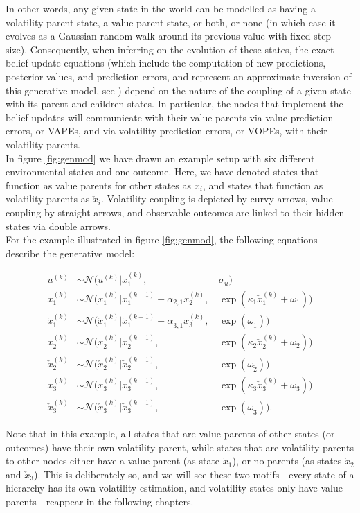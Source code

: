 In other words, any given state in the world can be modelled as having a volatility parent state, a value parent state, or both, or none (in which case it evolves as a Gaussian random walk around its previous value with fixed step size). Consequently, when inferring on the evolution of these states, the exact belief update equations (which include the computation of new predictions, posterior values, and prediction errors, and represent an approximate inversion of this generative model, see \cite{Mathys2011}) depend on the nature of the coupling of a given state with its parent and children states. In particular, the nodes that implement the belief updates will communicate with their value parents via value prediction errors, or \textsf{VAPE}s, and via volatility prediction errors, or \textsf{VOPE}s, with their volatility parents.\\

In figure \ref{fig:genmod} we have drawn an example setup with six different environmental states and one outcome. Here, we have denoted states that function as value parents for other states as $x_i$, and states that function as volatility parents as $\check{x}_i$. Volatility coupling is depicted by curvy arrows, value coupling by straight arrows, and observable outcomes are linked to their hidden states via double arrows. \\

For the example illustrated in figure \ref{fig:genmod}, the following equations describe the generative model:

\begin{align}
    u^{(k)}             &\sim \mathcal{N}(u^{(k)} | x_1^{(k)}, \, &\sigma_u)\\
    x_1^{(k)}           &\sim \mathcal{N}(x_1^{(k)} | x_1^{(k-1)} + \alpha_{2,1} x_2^{(k)}, \, &\exp(\kappa_1 \check{x}_1^{(k)} + \omega_1))\\
    \check{x}_1^{(k)}   &\sim \mathcal{N}(\check{x}_1^{(k)} | \check{x}_1^{(k-1)} + \alpha_{3,\check{1}} x_3^{(k)}, \, &\exp(\omega_{\check{1}}))\\
    x_2^{(k)}           &\sim \mathcal{N}(x_2^{(k)} | x_2^{(k-1)}, \, &\exp(\kappa_2 \check{x}_2^{(k)} + \omega_2))\\
    \check{x}_2^{(k)}   &\sim \mathcal{N}(\check{x}_2^{(k)} | \check{x}_2^{(k-1)}, \, &\exp(\omega_{\check{2}}))\\
    x_3^{(k)}           &\sim \mathcal{N}(x_3^{(k)} | x_3^{(k-1)}, \, &\exp(\kappa_3 \check{x}_3^{(k)} + \omega_3))\\
    \check{x}_3^{(k)}   &\sim \mathcal{N}(\check{x}_3^{(k)} | \check{x}_3^{(k-1)}, \, &\exp(\omega_{\check{3}})).
\end{align}

Note that in this example, all states that are value parents of other states (or outcomes) have their own volatility parent, while states that are volatility parents to other nodes either have a value parent (as state $\check{x}_1$), or no parents (as states $\check{x}_2$ and $\check{x}_3$). This is deliberately so, and we will see these two motifs - every state of a hierarchy has its own volatility estimation, and volatility states only have value parents - reappear in the following chapters.